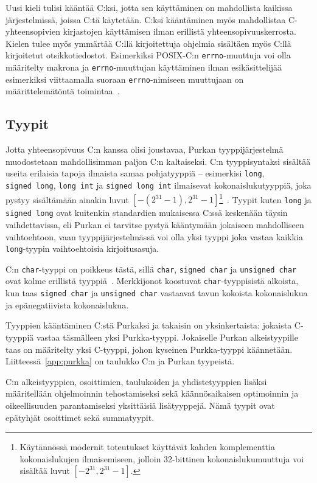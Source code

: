 Uusi kieli tulisi kääntää C:ksi, jotta sen käyttäminen on mahdollista kaikissa
järjestelmissä, joissa C:tä käytetään. C:ksi kääntäminen myös mahdollistaa
C-yhteensopivien kirjastojen käyttämisen ilman erillistä
yhteensopivuuskerrosta. Kielen tulee myös ymmärtää C:llä kirjoitettuja ohjelmia
sisältäen myös C:llä kirjoitetut otsikkotiedostot. Esimerkiksi POSIX-C:n
\texttt{errno}-muuttuja voi olla määritelty makrona ja \texttt{errno}-muuttujan
käyttäminen ilman esikäsittelijää esimerkiksi viittaamalla suoraan
\texttt{errno}-nimiseen muuttujaan on määrittelemätöntä toimintaa~\citep[s.
234]{POSIX}.

\subsection{Tyypit}

Jotta yhteensopivuus C:n kanssa olisi joustavaa, Purkan tyyppijärjestelmä
muodostetaan mahdollisimman paljon C:n kaltaiseksi. C:n tyyppisyntaksi sisältää
useita erilaisia tapoja ilmaista samaa pohjatyyppiä -- esimerkisi
\texttt{long}, \texttt{signed~long}, \texttt{long~int} ja
\texttt{signed~long~int} ilmaisevat kokonaislukutyyppiä, joka pystyy
sisältämään ainakin luvut $[-(2^{31} - 1), 2^{31}-1]$\footnote{Käytännössä
modernit toteutukset käyttävät kahden komplementtia kokonaislukujen
ilmaisemiseen, jolloin 32-bittinen kokonaislukumuuttuja voi sisältää luvut
$[-2^{31}, 2^{31} - 1]$.}~\citep{C18}. Tyypit kuten \texttt{long} ja
\texttt{signed long} ovat kuitenkin standardien mukaisessa C:ssä keskenään
täysin vaihdettavissa, eli Purkan ei tarvitse pystyä kääntymään jokaiseen
mahdolliseen vaihtoehtoon, vaan tyyppijärjestelmässä voi olla yksi tyyppi joka
vastaa kaikkia \texttt{long}-tyypin vaihtoehtoisia kirjoitusasuja.

C:n \texttt{char}-tyyppi on poikkeus tästä, sillä \texttt{char}, \texttt{signed
char} ja \texttt{unsigned char} ovat kolme erillistä tyyppiä~\citep{C18}.
Merkkijonot koostuvat \texttt{char}-tyyppisistä alkoista, kun taas
\texttt{signed char} ja \texttt{unsigned char} vastaavat tavun kokoista
kokonaislukua ja epänegatiivista kokonaislukua.

Tyyppien kääntäminen C:stä Purkaksi ja takaisin on yksinkertaista: jokaista
C-tyyppiä vastaa täsmälleen yksi Purkka-tyyppi. Jokaiselle Purkan
alkeistyypille taas on määritelty yksi C-tyyppi, johon kyseinen Purkka-tyyppi
käännetään. Liitteessä~\ref{app:purkka} on taulukko C:n ja Purkan tyypeistä. 

C:n alkeistyyppien, osoittimien, taulukoiden ja yhdistetyyppien lisäksi
määritellään ohjelmoinnin tehostamiseksi sekä käännösaikaisen optimoinnin ja
oikeellisuuden parantamiseksi yksittäisiä lisätyyppejä. Nämä tyypit ovat
epätyhjät osoittimet sekä summatyypit.

